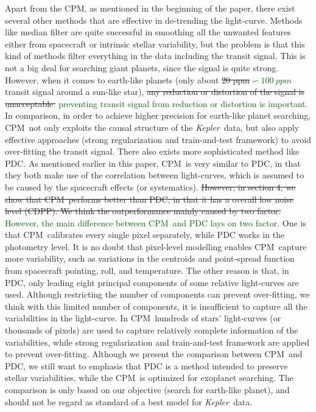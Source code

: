 \documentclass[12pt, preprint]{aastex}
\newcommand{\project}[1]{\textsl{#1}}
\newcommand{\Kepler}{\project{Kepler}}
\newcommand{\name}{CPM}
\newcommand{\revise}[1]{\textcolor{darkgreen}{#1}}
\newcommand{\remove}[1]{\sout{#1}}
\begin{document}
Apart from the \name, as mentioned in the beginning of the paper, 
  there exist several other methods that are effective in de-trending the light-curve.
Methods like median filter are quite successful in smoothing all the unwanted features 
  either from spacecraft or intrinsic stellar variability, 
  but the problem is that this kind of methods filter everything in the data including the transit signal. 
This is not a big deal for searching giant planets, since the signal is quite strong. 
However, 
  when it comes to earth-like planets (only about \remove{20 ppm}\revise{$\backsim 100\ ppm$} transit signal around a sun-like star),
  \remove{any reduction or distortion of the signal is unacceptable.}
  \revise{preventing transit signal from reduction or distortion is important.} 
In comparison, in order to achieve higher precision for earth-like planet searching, 
  \name\  not only exploits the causal structure of the \Kepler\ data,
  but also apply effective approaches (strong regularization and train-and-test framework)
  to avoid over-fitting the transit signal.
There also exists more sophisticated method like PDC.
As mentioned earlier in this paper, 
  \name\ is very similar to PDC, 
  in that they both make use of the correlation between light-curves,
  which is assumed to be caused by the spacecraft effects (or systematics).
\remove{However, in section 4, we show that \name\ performs better than PDC, 
  in that it has a overall low noise level (CDPP).
We think the outperformance mainly caused by two factor.}
\revise{However, the main difference between \name\ and PDC lays on two factor.}
One is that \name\ calibrates every single pixel separately, 
  while PDC works in the photometry level.
It is no doubt that pixel-level modelling enables \name\ capture more variability, such as 
variations in the centroids and point-spread function from spacecraft pointing, roll, and temperature.
The other reason is that,  
  in PDC,  only leading eight principal components of some relative light-curves are used.
Although restricting the number of components can prevent over-fitting, we think with this limited number of components, 
  it is insufficient to capture all the variabilities in the light-curve.
In \name\, hundreds of stars' light-curves (or thousands of pixels) are used 
  to capture relatively complete information of the variabilities, 
  while strong regularization and train-and-test framework are applied to prevent over-fitting.
Although we present the comparison between \name\ and PDC, 
  we still want to emphasis that PDC is a method intended to preserve stellar variabilities, 
  while the \name\ is optimized for exoplanet searching. 
The comparison is only based on our objective (search for earth-like planet), 
  and should not be regard as standard of a best model for \Kepler\ data.
  
\end{document}
